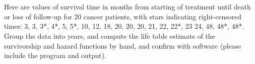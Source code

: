 \documentclass[12pt]{elegantbook}
\begin{document}

\setcounter{chapter}{1}
\chapter{}

    \begin{exercise*}[1]
        Here are values of survival time in months from starting of treatment until death or loss of follow-up for 20 cancer patients, with stars indicating right-censored times: 3, 3, 3*, 4*, 5, 5*, 10, 12, 18, 20, 20, 20, 21, 22, 22*, 23 24, 48, 48*, 48*. Group the data into years, and compute the life table estimate of the survivorship and hazard functions by hand, and confirm with software (please include the program and output). 
    \end{exercise*}
\end{document}
